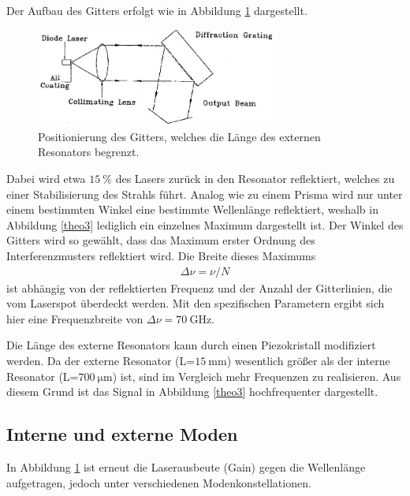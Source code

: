 Der Aufbau des Gitters erfolgt wie in Abbildung \ref{theo5} dargestellt.
\begin{figure}[H]
\centering
\includegraphics[width=0.7\textwidth]{ressources/Grating.png}
\caption{Positionierung des Gitters, welches die Länge des externen Resonators begrenzt. \cite{skript}}
\label{theo5}
\end{figure}

Dabei wird etwa $\SI{15}{\percent}$ des Lasers zurück in den Resonator reflektiert, welches zu einer Stabilisierung des Strahls führt. Analog wie zu einem Prisma wird nur unter einem bestimmten Winkel eine bestimmte Wellenlänge reflektiert, weshalb in Abbildung \ref{theo3} lediglich ein einzelnes Maximum dargestellt ist. Der Winkel des Gitters wird so gewählt, dass das Maximum erster Ordnung des Interferenzmusters reflektiert wird. Die Breite dieses Maximums
\begin{align}
	\Delta \nu= \nu/N
\end{align}
ist abhängig von der reflektierten Frequenz und der Anzahl der Gitterlinien, die vom Laserspot überdeckt werden. Mit den spezifischen Parametern ergibt sich hier eine Frequenzbreite von $\Delta \nu = \SI{70}{\giga\hertz}$.

Die Länge des externe Resonators kann durch einen Piezokristall modifiziert werden. Da der externe Resonator (L=$\SI{15}{\milli\meter}$) wesentlich größer als der interne Resonator (L=$\SI{700}{\micro\meter}$) ist, sind im Vergleich mehr Frequenzen zu realisieren. Aus diesem Grund ist das Signal in Abbildung \ref{theo3} hochfrequenter dargestellt. 

\subsection{Interne und externe Moden} 
In Abbildung \ref{theo5} ist erneut die Laserausbeute (Gain) gegen die Wellenlänge aufgetragen, jedoch unter verschiedenen Modenkonstellationen. 

